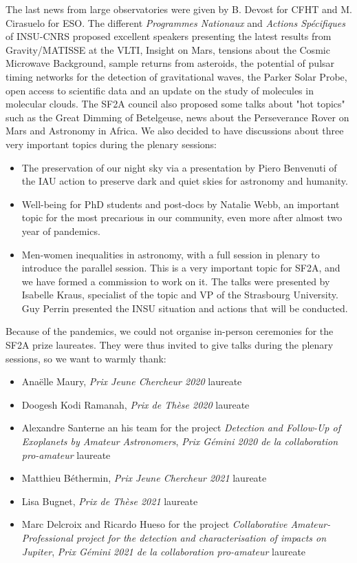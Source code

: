 The last news from large observatories were given by  B. Devost for CFHT and  M. Cirasuelo for ESO. The different \emph{Programmes Nationaux} and \emph{Actions Sp\'ecifiques} of INSU-CNRS proposed excellent speakers presenting the latest results from Gravity/MATISSE at the VLTI, Insight on Mars, tensions about the Cosmic Microwave Background, sample returns from asteroids, the potential of pulsar timing networks for the detection of gravitational waves, the Parker Solar Probe, open access to scientific data and an update on the study of molecules in molecular clouds. The SF2A council also proposed some talks about "hot topics" such as the Great Dimming of Betelgeuse, news about the Perseverance Rover on Mars and Astronomy in Africa. We also decided to have discussions about three very important topics during the plenary sessions:
\begin{itemize}
\item The preservation of our night sky via a presentation by Piero Benvenuti of the IAU action to preserve dark and quiet skies for astronomy and humanity.
\item Well-being for PhD students and post-docs by Natalie Webb, an important topic for the most precarious in our community, even more after almost two year of pandemics.
\item Men-women inequalities in astronomy, with a full session in plenary to introduce the parallel session. This is a very important topic for SF2A, and we have formed a commission to work on it. The talks were presented by Isabelle Kraus, specialist of the topic and VP of the Strasbourg University. Guy Perrin presented the INSU situation and actions that will be conducted.
\end{itemize}

Because of the pandemics, we could not organise in-person ceremonies for the SF2A prize laureates. They were thus invited to give talks during the plenary sessions, so we want to warmly thank:

\begin{itemize}
    \item Anaëlle Maury, \emph{Prix Jeune Chercheur 2020} laureate
    \item Doogesh Kodi Ramanah, \emph{Prix de Thèse 2020} laureate
    \item Alexandre Santerne an his team for the project \emph{Detection and Follow-Up of Exoplanets by Amateur Astronomers}, \emph{Prix Gémini 2020 de la collaboration pro-amateur} laureate
    \item Matthieu Béthermin, \emph{Prix Jeune Chercheur 2021} laureate
    \item Lisa Bugnet, \emph{Prix de Thèse 2021} laureate 
    \item Marc Delcroix and  Ricardo Hueso for the project \emph{Collaborative Amateur-Professional project for the detection and characterisation of impacts on Jupiter}, \emph{Prix Gémini 2021 de la collaboration pro-amateur} laureate
\end{itemize}

